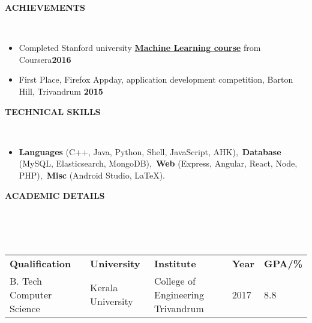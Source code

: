 \documentclass[a4paper,10pt]{article}
\newcommand{\lsep}{-0.5cm}
\newcommand{\resheading}[1]{{\small \colorbox{mygrey}{\begin{minipage}{0.975\textwidth}{\textbf{\uppercase{#1} \vphantom{p\^{E}}}}\end{minipage}}}}
\newcommand{\when}[1]{\hfill \textbf{#1}}
\newenvironment{noSepItemize}
{ \begin{itemize}
    \setlength{\itemsep}{1pt}
    \setlength{\parskip}{0pt}
    \setlength{\parsep}{0pt}     }
{ \end{itemize}                  }
\begin{document}
\resheading{\textbf{Achievements} }\\[\lsep]
\begin{noSepItemize}
	\item \noindent Completed Stanford university \textbf{\href{https://www.coursera.org/account/accomplishments/records/EJQWCKEBUSBD}{Machine Learning course}} from Coursera\when{2016}
	\item \noindent First Place, Firefox Appday, application development competition, Barton Hill, Trivandrum \when{2015}
\end{noSepItemize}

\resheading{\textbf{TECHNICAL SKILLS} }\\[\lsep]
\begin{noSepItemize}
\item \noindent \textbf{Languages} (C++, Java, Python, Shell, JavaScript, AHK),\, \textbf{Database} (MySQL, Elasticsearch, MongoDB),\, \textbf{Web} (Express, Angular, React, Node, PHP),\, \textbf{Misc} (Android Studio, \LaTeX).
\end{noSepItemize}

\resheading{\textbf{ACADEMIC DETAILS} }\\[\lsep]
\\ \\
\indent \begin{tabular}{ l @{\hskip 0.15in} l @{\hskip 0.15in} l @{\hskip 0.15in} l @{\hskip 0.15in} l }
\textbf{Qualification} & \textbf{University} & \textbf{Institute} & \textbf{Year} & \textbf{GPA/\%} \\
B. Tech Computer Science & Kerala University & College of Engineering Trivandrum & 2017 & 8.8\\
\end{tabular}
\\ \\
\end{document}
